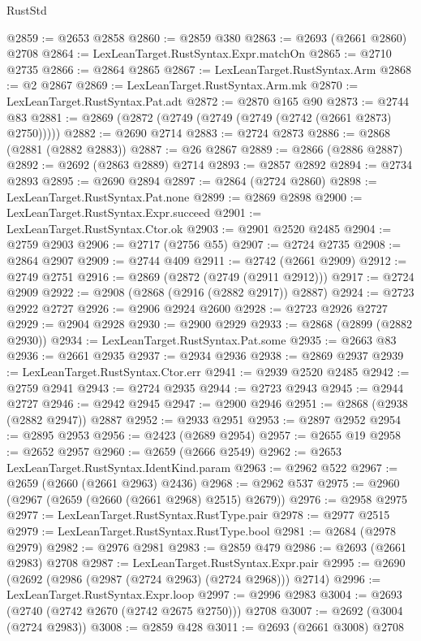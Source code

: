 \begin{lexlean}{RustStd}
\begin{coremodule}
@2859 := @2653 @2858
@2860 := @2859 @380
@2863 := @2693 (@2661 @2860) @2708
@2864 := LexLeanTarget.RustSyntax.Expr.matchOn
@2865 := @2710 @2735
@2866 := @2864 @2865
@2867 := LexLeanTarget.RustSyntax.Arm
@2868 := @2 @2867
@2869 := LexLeanTarget.RustSyntax.Arm.mk
@2870 := LexLeanTarget.RustSyntax.Pat.adt
@2872 := @2870 @165 @90
@2873 := @2744 @83
@2881 := @2869 (@2872 (@2749 (@2749 (@2749 (@2742 (@2661 @2873) @2750)))))
@2882 := @2690 @2714
@2883 := @2724 @2873
@2886 := @2868 (@2881 (@2882 @2883))
@2887 := @26 @2867
@2889 := @2866 (@2886 @2887)
@2892 := @2692 (@2863 @2889) @2714
@2893 := @2857 @2892
@2894 := @2734 @2893
@2895 := @2690 @2894
@2897 := @2864 (@2724 @2860)
@2898 := LexLeanTarget.RustSyntax.Pat.none
@2899 := @2869 @2898
@2900 := LexLeanTarget.RustSyntax.Expr.succeed
@2901 := LexLeanTarget.RustSyntax.Ctor.ok
@2903 := @2901 @2520 @2485
@2904 := @2759 @2903
@2906 := @2717 (@2756 @55)
@2907 := @2724 @2735
@2908 := @2864 @2907
@2909 := @2744 @409
@2911 := @2742 (@2661 @2909)
@2912 := @2749 @2751
@2916 := @2869 (@2872 (@2749 (@2911 @2912)))
@2917 := @2724 @2909
@2922 := @2908 (@2868 (@2916 (@2882 @2917)) @2887)
@2924 := @2723 @2922 @2727
@2926 := @2906 @2924 @2600
@2928 := @2723 @2926 @2727
@2929 := @2904 @2928
@2930 := @2900 @2929
@2933 := @2868 (@2899 (@2882 @2930))
@2934 := LexLeanTarget.RustSyntax.Pat.some
@2935 := @2663 @83
@2936 := @2661 @2935
@2937 := @2934 @2936
@2938 := @2869 @2937
@2939 := LexLeanTarget.RustSyntax.Ctor.err
@2941 := @2939 @2520 @2485
@2942 := @2759 @2941
@2943 := @2724 @2935
@2944 := @2723 @2943
@2945 := @2944 @2727
@2946 := @2942 @2945
@2947 := @2900 @2946
@2951 := @2868 (@2938 (@2882 @2947)) @2887
@2952 := @2933 @2951
@2953 := @2897 @2952
@2954 := @2895 @2953
@2956 := @2423 (@2689 @2954)
@2957 := @2655 @19
@2958 := @2652 @2957
@2960 := @2659 (@2666 @2549)
@2962 := @2653 LexLeanTarget.RustSyntax.IdentKind.param
@2963 := @2962 @522
@2967 := @2659 (@2660 (@2661 @2963) @2436)
@2968 := @2962 @537
@2975 := @2960 (@2967 (@2659 (@2660 (@2661 @2968) @2515) @2679))
@2976 := @2958 @2975
@2977 := LexLeanTarget.RustSyntax.RustType.pair
@2978 := @2977 @2515
@2979 := LexLeanTarget.RustSyntax.RustType.bool
@2981 := @2684 (@2978 @2979)
@2982 := @2976 @2981
@2983 := @2859 @479
@2986 := @2693 (@2661 @2983) @2708
@2987 := LexLeanTarget.RustSyntax.Expr.pair
@2995 := @2690 (@2692 (@2986 (@2987 (@2724 @2963) (@2724 @2968))) @2714)
@2996 := LexLeanTarget.RustSyntax.Expr.loop
@2997 := @2996 @2983
@3004 := @2693 (@2740 (@2742 @2670 (@2742 @2675 @2750))) @2708
@3007 := @2692 (@3004 (@2724 @2983))
@3008 := @2859 @428
@3011 := @2693 (@2661 @3008) @2708

\end{coremodule}
\end{lexlean}
